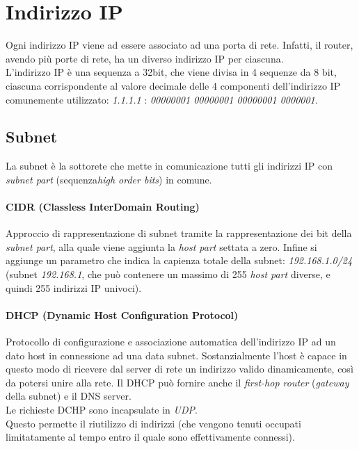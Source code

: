\section{Indirizzo IP}
Ogni indirizzo IP viene ad essere associato ad una porta di rete. Infatti, il router, avendo più porte di rete, ha un diverso indirizzo IP per ciascuna. \\
L'indirizzo IP è una sequenza a 32bit, che viene divisa in 4 sequenze da 8 bit, ciascuna corrispondente al valore decimale delle 4 componenti dell'indirizzo IP comunemente utilizzato: \textit{1.1.1.1} : \textit{00000001 00000001 00000001 0000001}.

\subsection{Subnet}
La subnet è la sottorete che mette in comunicazione tutti gli indirizzi IP con \textit{subnet part} (sequenza\textit{high order bits}) in comune.
\paragraph{CIDR (Classless InterDomain Routing)}
Approccio di rappresentazione di subnet tramite la rappresentazione dei bit della \textit{subnet part}, alla quale viene aggiunta la \textit{host part} settata a zero. Infine si aggiunge un parametro che indica la capienza totale della subnet: \textit{192.168.1.0/24} (subnet \textit{192.168.1}, che può contenere un massimo di 255 \textit{host part} diverse, e quindi 255 indirizzi IP univoci). \hfill \\
\paragraph{DHCP (Dynamic Host Configuration Protocol)}
Protocollo di configurazione e associazione automatica dell'indirizzo IP ad un dato host in connessione ad una data subnet.
Sostanzialmente l'host è capace in questo modo di ricevere dal server di rete un indirizzo valido dinamicamente, così da potersi unire alla rete.
Il DHCP può fornire anche il \textit{first-hop router} (\textit{gateway} della subnet) e il DNS server. \\
Le richieste DCHP sono incapsulate in \textit{UDP}. \\
Questo permette il riutilizzo di indirizzi (che vengono tenuti occupati limitatamente al tempo entro il quale sono effettivamente connessi).

